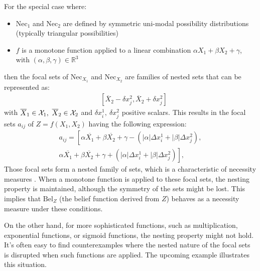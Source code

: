 For the special case where:
\begin{itemize}
    \item $\mathrm{Nec}_1$ and $\mathrm{Nec}_2$ are defined by symmetric uni-modal possibility distributions (typically triangular possibilities)
    \item $f$ is a monotone function applied to a linear combination $\alpha X_1 + \beta X_2 + \gamma$, with $(\alpha, \beta, \gamma) \in \mathbb{R}^3$
\end{itemize}
then the focal sets of $\mathrm{Nec}_{X_1}$ and $\mathrm{Nec}_{X_2}$ are families of nested sets that can be represented as:
\begin{align*}
    [\overline{X}_1-\delta x^1_i, \overline{X}_1+\delta x^1_i]\quad[\overline{X}_2-\delta x^2_j, \overline{X}_2+\delta x^2_j]
\end{align*}
with $\overline{X}_1\in{\mathcal{X}}_1,~\overline{X}_2\in{\mathcal{X}}_2$ and $\delta x^1_i,~\delta x^2_j$ positive scalars. This results in the focal sets $a_{ij}$ of $Z = f(X_1, X_2)$ having the following expression:
\begin{align*}
    a_{ij} = \left[ \alpha \overline{X_1} + \beta \overline{X_2} + \gamma - (|\alpha| \Delta x^1_i + |\beta| \Delta x^2_j), \right. \\
                 \left. \alpha \overline{X_1} + \beta \overline{X_2} + \gamma + (|\alpha| \Delta x^1_i + |\beta| \Delta x^2_j) \right],
\end{align*}
Those focal sets form a nested family of sets, which is a characteristic of necessity measures \cite{shafer_mathematical_1976}. When a monotone function is applied to these focal sets, the nesting property is maintained, although the symmetry of the sets might be lost. This implies that $\mathrm{Bel}_Z$ (the belief function derived from $Z$) behaves as a necessity measure under these conditions.

On the other hand, for more sophisticated functions, such as multiplication, exponential functions, or sigmoid functions, the nesting property might not hold. It's often easy to find counterexamples where the nested nature of the focal sets is disrupted when such functions are applied. The upcoming example illustrates this situation.

